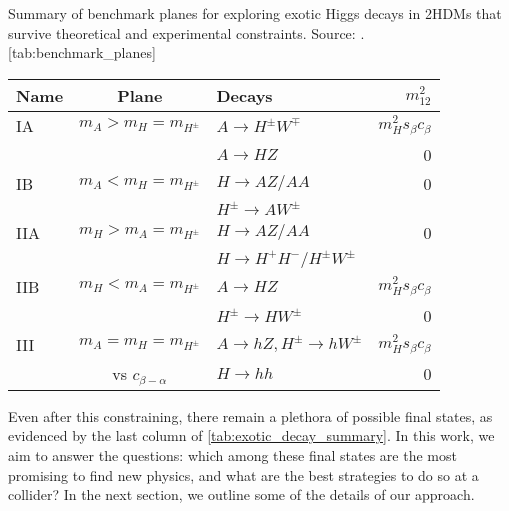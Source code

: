 \begin{table}
  \centering
  \begin{sidecaption}{Summary of benchmark planes for exploring exotic Higgs decays in 2HDMs that survive theoretical and experimental constraints. Source: \cite{Kling2016}.}[tab:benchmark_planes]
  \begin{tabular}{lclr}
    \toprule
    Name    & Plane                   & Decays                                    & $m_{12}^2$\\\midrule
    IA      & $m_A > m_H = m_{H^\pm}$ & $A\rightarrow H^\pm W^\mp$                & $m_H^2s_\beta c_\beta$\\
            &                         & $A\rightarrow HZ$                         & 0 \\\midrule
    IB      & $m_A < m_H = m_{H^\pm}$ & $H\rightarrow AZ/AA$                      & 0\\
            &                         & $H^\pm\rightarrow AW^\pm$                 & \\\midrule
    IIA     & $m_H > m_A = m_{H^\pm}$ & $H\rightarrow AZ/AA$                      & 0\\
            &                         & $H\rightarrow H^+H^-/H^\pm W^\pm$         & \\\midrule
    IIB     & $m_H < m_A = m_{H^\pm}$ & $A\rightarrow HZ$                         & $m_H^2s_\beta c_\beta$\\
            &                         & $H^\pm\rightarrow HW^\pm$                 & 0 \\\midrule
    III     & $m_A = m_H = m_{H^\pm}$ & $A\rightarrow hZ,H^\pm\rightarrow hW^\pm$ & $m_H^2s_\beta c_\beta$\\
            & vs $c_{\beta-\alpha}$   & $H\rightarrow hh$                         & 0 \\
    \bottomrule
  \end{tabular}
\end{sidecaption}
\end{table}

Even after this constraining, there remain a plethora of possible final states, as evidenced by the last column of \autoref{tab:exotic_decay_summary}. In this work, we aim to answer the questions: which among these final states are the most promising to find new physics, and what are the best strategies to do so at a collider? In the next section, we outline some of the details of our approach.


